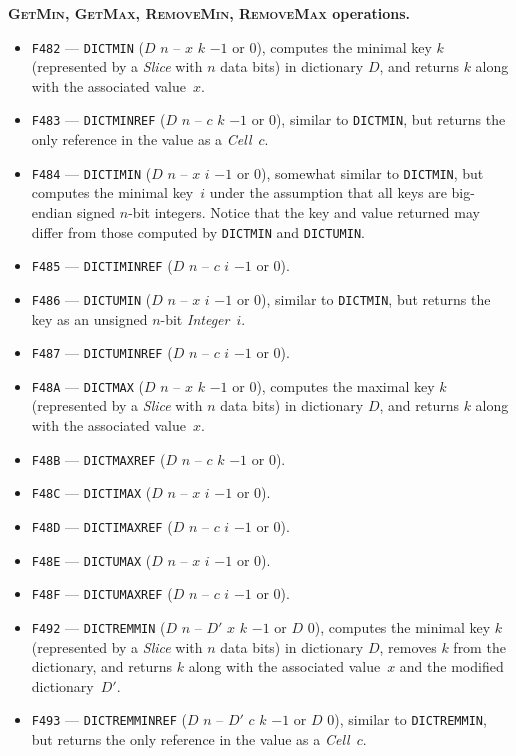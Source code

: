 \documentclass[12pt,oneside]{article}
\def\makepoint#1{\medbreak\noindent{\bf #1.\ }}
\def\nxsubpoint{\refstepcounter{subsubsection}%
    \smallbreak\makepoint{\thesubsubsection}}
\def\emb#1{\textbf{#1.}}
\begin{document}
\nxsubpoint\emb{\textsc{GetMin}, \textsc{GetMax}, \textsc{RemoveMin}, \textsc{RemoveMax} operations}
\begin{itemize}
\item {\tt F482} --- {\tt DICTMIN} ($D$ $n$ -- $x$ $k$ $-1$ or $0$), computes the minimal key $k$ (represented by a {\em Slice} with $n$ data bits) in dictionary $D$, and returns $k$ along with the associated value~$x$.
\item {\tt F483} --- {\tt DICTMINREF} ($D$ $n$ -- $c$ $k$ $-1$ or $0$), similar to {\tt DICTMIN}, but returns the only reference in the value as a {\em Cell\/}~$c$.
\item {\tt F484} --- {\tt DICTIMIN} ($D$ $n$ -- $x$ $i$ $-1$ or $0$), somewhat similar to {\tt DICTMIN}, but computes the minimal key~$i$ under the assumption that all keys are big-endian signed $n$-bit integers. Notice that the key and value returned may differ from those computed by {\tt DICTMIN} and {\tt DICTUMIN}.
\item {\tt F485} --- {\tt DICTIMINREF} ($D$ $n$ -- $c$ $i$ $-1$ or $0$).
\item {\tt F486} --- {\tt DICTUMIN} ($D$ $n$ -- $x$ $i$ $-1$ or $0$), similar to {\tt DICTMIN}, but returns the key as an unsigned $n$-bit {\em Integer}~$i$.
\item {\tt F487} --- {\tt DICTUMINREF} ($D$ $n$ -- $c$ $i$ $-1$ or $0$).
\item {\tt F48A} --- {\tt DICTMAX} ($D$ $n$ -- $x$ $k$ $-1$ or $0$), computes the maximal key $k$ (represented by a {\em Slice\/} with $n$ data bits) in dictionary $D$, and returns $k$ along with the associated value~$x$.
\item {\tt F48B} --- {\tt DICTMAXREF} ($D$ $n$ -- $c$ $k$ $-1$ or $0$).
\item {\tt F48C} --- {\tt DICTIMAX} ($D$ $n$ -- $x$ $i$ $-1$ or $0$).
\item {\tt F48D} --- {\tt DICTIMAXREF} ($D$ $n$ -- $c$ $i$ $-1$ or $0$).
\item {\tt F48E} --- {\tt DICTUMAX} ($D$ $n$ -- $x$ $i$ $-1$ or $0$).
\item {\tt F48F} --- {\tt DICTUMAXREF} ($D$ $n$ -- $c$ $i$ $-1$ or $0$).
\item {\tt F492} --- {\tt DICTREMMIN} ($D$ $n$ -- $D'$ $x$ $k$ $-1$ or $D$ $0$), computes the minimal key $k$ (represented by a {\em Slice} with $n$ data bits) in dictionary $D$, removes $k$ from the dictionary, and returns $k$ along with the associated value~$x$ and the modified dictionary~$D'$.
\item {\tt F493} --- {\tt DICTREMMINREF} ($D$ $n$ -- $D'$ $c$ $k$ $-1$ or $D$ $0$), similar to {\tt DICTREMMIN}, but returns the only reference in the value as a {\em Cell\/}~$c$.

\end{itemize}
\end{document}

